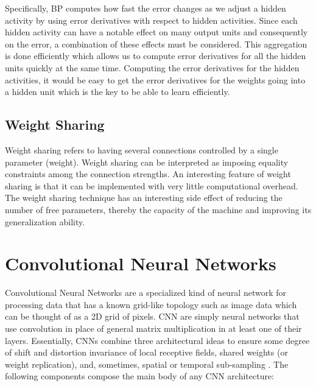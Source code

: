 Specifically, BP computes how fast the error changes as we adjust a hidden activity by using error derivatives with respect to hidden activities. Since each hidden activity can have a notable effect on many output units and consequently on the error, a combination of these effects must be considered. This aggregation is done efficiently which allows us to compute error derivatives for all the hidden units quickly at the same time. Computing the error derivatives for the hidden activities, it would be easy to get the error derivatives for the weights going into a hidden unit which is the key to be able to learn efficiently. 

\subsection{Weight Sharing}
Weight sharing refers to having several connections controlled by a single parameter (weight). Weight sharing can be interpreted as imposing equality constraints among the connection strengths. An interesting feature of weight sharing is that it can be implemented with very little computational overhead\cite{lecun1989generalization}. The weight sharing technique has an interesting side effect of reducing the number of free parameters, thereby the capacity of the machine and improving its generalization ability\cite{lecun2010convolutional}.

\section{Convolutional Neural Networks}

Convolutional Neural Networks are a specialized kind of neural network for processing data that has a known grid-like topology such as image data which can be thought of as a 2D grid of pixels. CNN are simply neural networks that use convolution in place of general matrix multiplication in at least one of their layers\cite{Goodfellow-et-al-2016-Book}. 
Essentially, CNNs combine three architectural ideas to ensure some degree of shift and distortion invariance of local receptive fields, shared weights (or weight replication), and, sometimes, spatial or temporal sub-sampling\cite{lecun2010convolutional} . 
The following components compose the main body of any CNN architecture:

